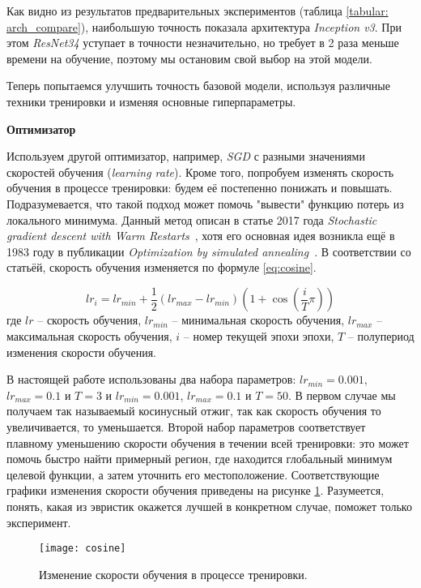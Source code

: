 \indent
\indent
Как видно из результатов предварительных экспериментов
(таблица \ref{tabular: arch_compare}), наибольшую
точность показала архитектура \textit{Inception v3}. При этом 
\textit{ResNet34} уступает в точности незначительно, но требует
в 2 раза меньше времени на обучение, поэтому мы остановим свой
выбор на этой модели. 


Теперь попытаемся улучшить точность базовой модели,
используя различные техники тренировки и изменяя основные гиперпараметры.

\indent
\indent
\textbf{Оптимизатор}

\indent
Используем другой оптимизатор, например, \textit{SGD} с 
разными значениями скоростей обучения (\textit{learning rate}).
Кроме того, попробуем изменять скорость обучения в процессе тренировки:
будем её постепенно понижать и повышать.
Подразумевается, что такой подход может
помочь "вывести" функцию потерь из локального минимума. Данный
метод описан в статье 2017 года
\textit{Stochastic gradient descent with Warm Restarts}~\cite{cosine},
хотя его основная идея возникла ещё в 1983 году в публикации
\textit{Optimization by simulated annealing}~\cite{annealing}. В соответствии со
статьёй, скорость обучения изменяется по формуле \ref{eq:cosine}.

\begin{equation}\label{eq:cosine}
    lr_i = lr_{min} + \frac{1}{2} (lr_{max} - lr_{min}) (1 + \cos(\frac{i}{T} \pi ))
\end{equation}
где $lr$ -- скорость обучения,
$lr_{min}$ -- минимальная скорость обучения,
$lr_{max}$ -- максимальная скорость обучения,
$i$ -- номер текущей эпохи эпохи,
$T$ -- полупериод изменения скорости обучения. 

\indent
В настоящей работе использованы два набора параметров:
$lr_{min} = 0.001$, $lr_{max} = 0.1$ и $T = 3$ и
$lr_{min} = 0.001$, $lr_{max} = 0.1$ и $T = 50$. 
В первом случае мы получаем так называемый косинусный отжиг,
так как скорость обучения то увеличивается, то уменьшается.
Второй набор параметров соответствует плавному
уменьшению скорости обучения в течении всей тренировки:
это может помочь быстро найти примерный регион,
где находится глобальный
минимум целевой функции, а затем уточнить его местоположение.
Соответствующие графики изменения
скорости обучения приведены на рисунке \ref{tikzpicture: cosine}.
Разумеется, понять,
какая из эвристик окажется лучшей в конкретном случае, поможет
только эксперимент.


\begin{figure}[h!]
    \begin{center}
   	    \texttt{[image: cosine]}
   	\end{center}
   	\caption{Изменение скорости обучения в процессе тренировки.}
   	\label{tikzpicture: cosine}
\end{figure}


